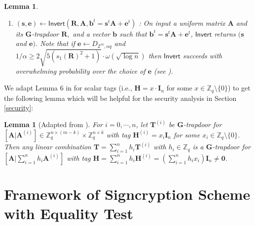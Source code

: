 \documentclass[a4paper,11pt,onecolumn]{elsarticle}
\newtheorem{lemma}[theorem]{Lemma}
\begin{document}
\begin{lemma}
\begin{enumerate}
	\item $(\mathbf{s},\mathbf{e})  \leftarrow \mathsf{Invert}(\mathbf{R},\mathbf{A},\mathbf{b}^t=\mathbf{s}^t\mathbf{A}+\mathbf{e}^t) $ \cite[Algorithm 2]{MP12}: On input a uniform matrix  $\mathbf{A}$ and its $\mathbf{G}$-trapdoor $\mathbf{R},$ and a vector $\mathbf{b}$ such that $\mathbf{b}^t=\mathbf{s}^t\mathbf{A}+\mathbf{e}^t$,  $\mathsf{Invert}$ returns $(\mathbf{s}$ and $\mathbf{e})$. Note that if $\textbf{e} \gets D_{\mathbb{Z}^m,\alpha q}$ and $1/\alpha \geq 2 \sqrt{5 (s_1(\mathbf{R})^2+1)}\cdot \omega(\sqrt{\log n})$ then  $\mathsf{Invert}$ succeeds with overwhelming probability over the choice of $\mathbf{e}$ (see \cite[Theorem 5.4]{MP12}).
		
		
	\end{enumerate}
	\end{lemma}



	
		
	
	We adapt Lemma 6 in \cite{DM14} for scalar tags (i.e., $\mathbf{H}=x\cdot \mathbf{I}_n$ for some $x \in \mathbb{Z}_q\setminus \{0\}$) to get the following lemma which will be helpful for the security analysis in Section \ref{security}:
	
		\begin{lemma}[{Adapted from  \cite[Lemma 6]{DM14}}] \label{lemma4}
	For $i=0,\cdots, n$, let $\mathbf{T}^{(i)}$ be $\mathbf{G}$-trapdoor for $[\mathbf{A}|\mathbf{A}^{(i)}] \in \mathbb{Z}_q^{n\times (m-k)}\times \mathbb{Z}_q^{n \times k}$ with tag $\mathbf{H}^{(i)}=x_i \mathbf{I}_n$ for some $x_i \in \mathbb{Z}_q\setminus \{0\}$. Then any linear combination $\mathbf{T}=\sum_{i=1}^{n}h_i \mathbf{T}^{(i)}$ with $h_i \in \mathbb{Z}_q$ is a $\mathbf{G}$-trapdoor for $[\mathbf{A}|\sum_{i=1}^{n}h_i \mathbf{A}^{(i)}]$ with tag $\mathbf{H}=\sum_{i=1}^{n}h_i \mathbf{H}^{(i)}=(\sum_{i=1}^{n}h_i x_i)  \mathbf{I}_n \neq \mathbf{0}$.
			\end{lemma}
		
		
	\section{Framework of Signcryption Scheme with Equality Test} \label{scet}
\end{document}
